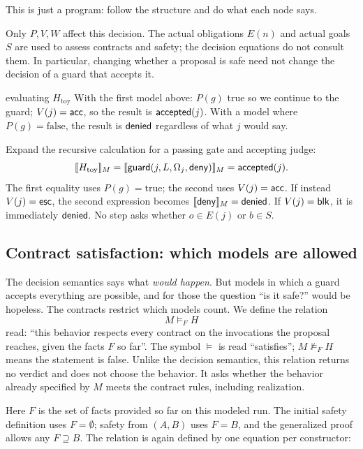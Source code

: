 This is just a program: follow the structure and do what each node says.

Only $P,V,W$ affect this decision. The actual obligations $E(n)$ and actual goals $S$ are used to assess contracts and safety; the decision equations do not consult them. In particular, changing whether a proposal is safe need not change the decision of a guard that accepts it.

\begin{example}{evaluating $H_{\mathrm{toy}}$}
With the first model above: $P(g)$ true so we continue to the guard; $V(j)=\mathsf{acc}$, so the result is $\mathsf{accepted}(j)$. With a model where $P(g)=\text{false}$, the result is $\mathsf{denied}$ regardless of what $j$ would say.

Expand the recursive calculation for a passing gate and accepting judge:
\[
\llbracket H_{\mathrm{toy}}\rrbracket_{M}
 =\llbracket \mathsf{guard}(j,L,\Omega_j,\mathsf{deny})\rrbracket_{M}
 =\mathsf{accepted}(j).
\]
The first equality uses $P(g)=\mathrm{true}$; the second uses $V(j)=\mathsf{acc}$. If instead $V(j)=\mathsf{esc}$, the second expression becomes $\llbracket \mathsf{deny}\rrbracket_{M}=\mathsf{denied}$. If $V(j)=\mathsf{blk}$, it is immediately $\mathsf{denied}$. No step asks whether $o\in E(j)$ or $b\in S$.
\end{example}

\subsection{Contract satisfaction: which models are allowed}

The decision semantics says what \emph{would happen}. But models in which a guard accepts everything are possible, and for those the question ``is it safe?'' would be hopeless. The contracts restrict which models count. We define the relation
\[
M\models_F H
\]
read: ``this behavior respects every contract on the invocations the proposal reaches, given the facts $F$ so far''.
The symbol $\models$ is read ``satisfies''; $M\not\models_F H$ means the statement is false. Unlike the decision semantics, this relation returns no verdict and does not choose the behavior. It asks whether the behavior already specified by $M$ meets the contract rules, including realization.

Here $F$ is the set of facts provided so far on this modeled run. The initial safety definition uses $F=\emptyset$; safety from $(A,B)$ uses $F=B$, and the generalized proof allows any $F\supseteq B$. The relation is again defined by one equation per constructor:

